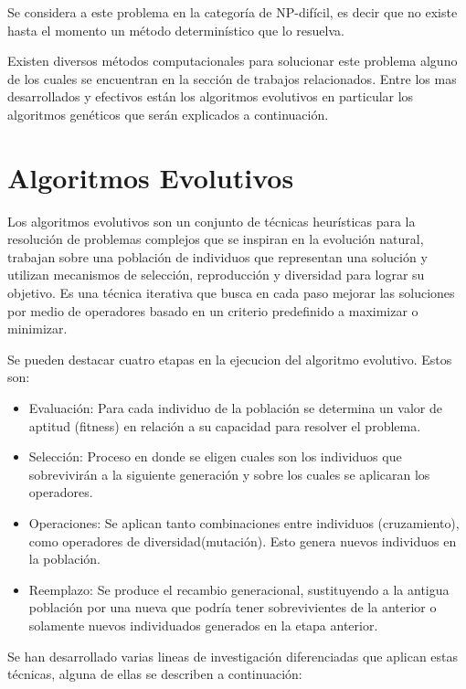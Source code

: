 Se considera a este problema en la categoría de NP-difícil, es decir que no existe hasta el momento un método determinístico que lo resuelva.

Existen diversos métodos computacionales para solucionar este problema alguno de los cuales se encuentran en la sección de trabajos relacionados. Entre los mas desarrollados y efectivos están los algoritmos evolutivos en particular los algoritmos genéticos que serán explicados a continuación.

\section{Algoritmos Evolutivos}

Los algoritmos evolutivos son un conjunto de técnicas heurísticas para la resolución de problemas complejos que se inspiran en la evolución natural, trabajan sobre una población de individuos que representan una solución y utilizan mecanismos de selección, reproducción y diversidad para lograr su objetivo. 
Es una técnica iterativa que busca en cada paso mejorar las soluciones por medio de operadores basado en un criterio predefinido a maximizar o minimizar.

Se pueden destacar cuatro etapas en la ejecucion del algoritmo evolutivo. Estos son:

\begin{itemize}
	\item Evaluación: Para cada individuo de la población se determina un valor de aptitud (fitness) en relación a su capacidad para resolver el problema. 
	\item Selección: Proceso en donde se eligen cuales son los individuos que sobrevivirán a la siguiente generación y sobre los cuales se aplicaran los operadores.
	\item Operaciones: Se aplican tanto combinaciones entre individuos (cruzamiento), como operadores de diversidad(mutación). Esto genera nuevos individuos en la población.
	\item Reemplazo: Se produce el recambio generacional, sustituyendo a la antigua población por una nueva que podría tener sobrevivientes de la anterior o solamente nuevos individuados generados en la etapa anterior.
\end{itemize}

Se han desarrollado varias lineas de investigación diferenciadas que aplican estas técnicas, alguna de ellas se describen a continuación:

